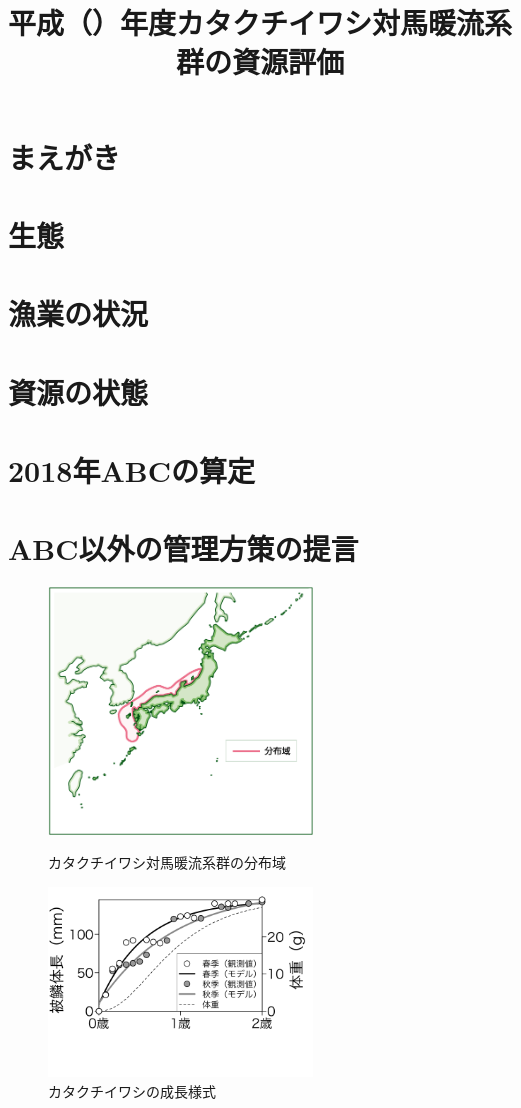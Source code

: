 \documentclass{jsarticle}
\title{平成\ThisYrJP（\ThisYr）年度カタクチイワシ対馬暖流系群の資源評価}
\author{}
\date{}
\newcommand{\ThisYr}{2018}
\begin{document}
\maketitle
\section{まえがき}
\section{生態}
\section{漁業の状況}
\section{資源の状態}
\section{\ThisYr 年ABCの算定}
\section{ABC以外の管理方策の提言}

\begin{figure}[htp]
 \begin{minipage}{0.5\hsize}
  \begin{center}
   \includegraphics[width=70mm]{figs/map.png}
  \end{center}
  \caption{カタクチイワシ対馬暖流系群の分布域}
  \label{fig:distrib}
 \end{minipage}
 \begin{minipage}{0.5\hsize}
  \begin{center}
   \includegraphics[width=70mm]{figs/age_length.png}
  \end{center}
  \caption{カタクチイワシの成長様式}
  \label{fig:agelen}
 \end{minipage}
\end{figure}
\end{document}

